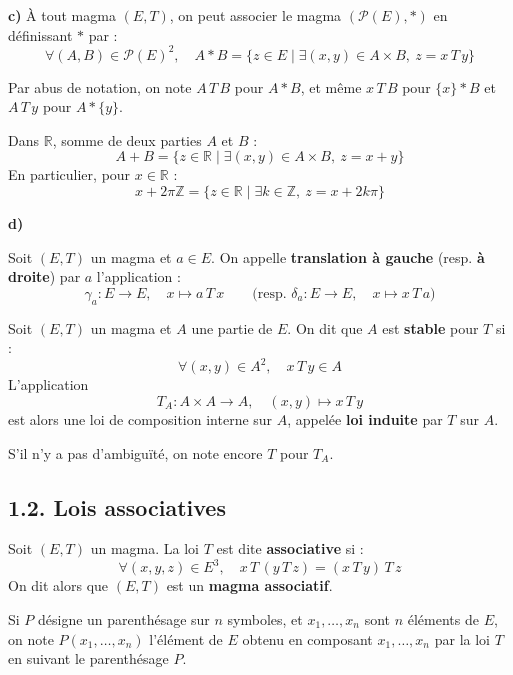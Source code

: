\documentclass[a4paper,11pt]{article}
\newcommand{\R}{\mathbb{R}}
\newcommand{\Z}{\mathbb{Z}}
\newcommand{\mot}[1]{\textcolor{bordeaux}{\textbf{#1}}}
\begin{document}
\vspace{8pt}
\textbf{c)} À tout magma $(E, T)$, on peut associer le magma $(\mathcal{P}(E), *)$ en définissant $*$ par :
\[
\forall (A, B) \in \mathcal{P}(E)^2, \quad A * B = \{ z \in E \mid \exists (x, y) \in A \times B, \ z = x \, T \, y \}
\]

Par abus de notation, on note $A \, T \, B$ pour $A * B$, et même $x \, T \, B$ pour $\{x\} * B$ et $A \, T \, y$ pour $A * \{y\}$.

\begin{exemples}
Dans $\R$, somme de deux parties $A$ et $B$ :
\[
A + B = \{ z \in \R \mid \exists (x, y) \in A \times B, \ z = x + y \}
\]
En particulier, pour $x \in \R$ :
\[
x + 2\pi\Z = \{ z \in \R \mid \exists k \in \Z, \ z = x + 2k\pi \}
\]
\end{exemples}

\textbf{d)}
\begin{definition}
Soit $(E, T)$ un magma et $a \in E$. On appelle \mot{translation à gauche} (resp. \mot{à droite}) par $a$ l'application :
\[
\gamma_a : E \longrightarrow E, \quad x \longmapsto a \, T \, x \qquad \text{(resp. } \delta_a : E \longrightarrow E, \quad x \longmapsto x \, T \, a \text{)}
\]
\end{definition}

\begin{definition}
Soit $(E, T)$ un magma et $A$ une partie de $E$. On dit que $A$ est \mot{stable} pour $T$ si :
\[
\forall (x, y) \in A^2, \quad x \, T \, y \in A
\]
L'application
\[
T_A : A \times A \longrightarrow A, \quad (x, y) \longmapsto x \, T \, y
\]
est alors une loi de composition interne sur $A$, appelée \mot{loi induite} par $T$ sur $A$.

S'il n'y a pas d'ambiguïté, on note encore $T$ pour $T_A$.
\end{definition}

\newpage
\subsection{1.2. Lois associatives}

\begin{definition}
Soit $(E, T)$ un magma. La loi $T$ est dite \mot{associative} si :
\[
\forall (x, y, z) \in E^3, \quad x \, T \, (y \, T \, z) = (x \, T \, y) \, T \, z
\]
On dit alors que $(E, T)$ est un \mot{magma associatif}.
\end{definition}

Si $P$ désigne un parenthésage sur $n$ symboles, et $x_1, \dots, x_n$ sont $n$ éléments de $E$, on note $P(x_1, \dots, x_n)$ l'élément de $E$ obtenu en composant $x_1, \dots, x_n$ par la loi $T$ en suivant le parenthésage $P$.
\end{document}
